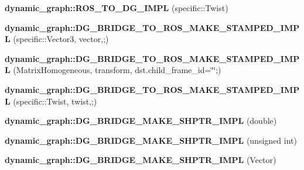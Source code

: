 \begin{DoxyCompactItemize}
\item 
{\bfseries dynamic\+\_\+graph\+::\+R\+O\+S\+\_\+\+T\+O\+\_\+\+D\+G\+\_\+\+I\+M\+PL} (specific\+::\+Twist)\hypertarget{namespacedynamic__graph_ada45ff2abeb0b52a629bd8ece8a27886}{}\label{namespacedynamic__graph_ada45ff2abeb0b52a629bd8ece8a27886}

\item 
{\bfseries dynamic\+\_\+graph\+::\+D\+G\+\_\+\+B\+R\+I\+D\+G\+E\+\_\+\+T\+O\+\_\+\+R\+O\+S\+\_\+\+M\+A\+K\+E\+\_\+\+S\+T\+A\+M\+P\+E\+D\+\_\+\+I\+M\+PL} (specific\+::\+Vector3, vector,;)\hypertarget{namespacedynamic__graph_a9ea269ba67038abab862daa1fb395703}{}\label{namespacedynamic__graph_a9ea269ba67038abab862daa1fb395703}

\item 
{\bfseries dynamic\+\_\+graph\+::\+D\+G\+\_\+\+B\+R\+I\+D\+G\+E\+\_\+\+T\+O\+\_\+\+R\+O\+S\+\_\+\+M\+A\+K\+E\+\_\+\+S\+T\+A\+M\+P\+E\+D\+\_\+\+I\+M\+PL} (Matrix\+Homogeneous, transform, dst.\+child\+\_\+frame\+\_\+id=\char`\"{}\char`\"{};)\hypertarget{namespacedynamic__graph_a612d5b355619bf2e6aaa3be10d400882}{}\label{namespacedynamic__graph_a612d5b355619bf2e6aaa3be10d400882}

\item 
{\bfseries dynamic\+\_\+graph\+::\+D\+G\+\_\+\+B\+R\+I\+D\+G\+E\+\_\+\+T\+O\+\_\+\+R\+O\+S\+\_\+\+M\+A\+K\+E\+\_\+\+S\+T\+A\+M\+P\+E\+D\+\_\+\+I\+M\+PL} (specific\+::\+Twist, twist,;)\hypertarget{namespacedynamic__graph_a9d5a83519738ca735c3c2b33ffe4b8fa}{}\label{namespacedynamic__graph_a9d5a83519738ca735c3c2b33ffe4b8fa}

\item 
{\bfseries dynamic\+\_\+graph\+::\+D\+G\+\_\+\+B\+R\+I\+D\+G\+E\+\_\+\+M\+A\+K\+E\+\_\+\+S\+H\+P\+T\+R\+\_\+\+I\+M\+PL} (double)\hypertarget{namespacedynamic__graph_ae22a330aece4dccbed6a8e24ac897223}{}\label{namespacedynamic__graph_ae22a330aece4dccbed6a8e24ac897223}

\item 
{\bfseries dynamic\+\_\+graph\+::\+D\+G\+\_\+\+B\+R\+I\+D\+G\+E\+\_\+\+M\+A\+K\+E\+\_\+\+S\+H\+P\+T\+R\+\_\+\+I\+M\+PL} (unsigned int)\hypertarget{namespacedynamic__graph_a6f98ec6c1978860a339800f794b86c6a}{}\label{namespacedynamic__graph_a6f98ec6c1978860a339800f794b86c6a}

\item 
{\bfseries dynamic\+\_\+graph\+::\+D\+G\+\_\+\+B\+R\+I\+D\+G\+E\+\_\+\+M\+A\+K\+E\+\_\+\+S\+H\+P\+T\+R\+\_\+\+I\+M\+PL} (Vector)\hypertarget{namespacedynamic__graph_a75a4142b33cde4c86e2bc4b7b410be5a}{}\label{namespacedynamic__graph_a75a4142b33cde4c86e2bc4b7b410be5a}


\end{DoxyCompactItemize}
